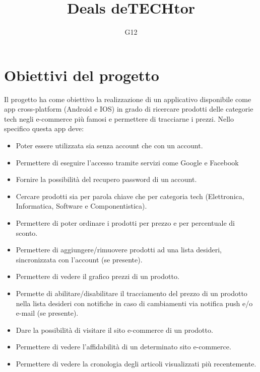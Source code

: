 \documentclass{article}
\author{G12}
\title{Deals deTECHtor}
\date{}
\begin{document}
\maketitle
\tableofcontents
\clearpage
\section{Obiettivi del progetto}
Il progetto ha come obiettivo la realizzazione di un applicativo disponibile come app cross-platform (Android e IOS) in grado di ricercare prodotti
delle categorie tech negli e-commerce più famosi e permettere di tracciarne i prezzi.
Nello specifico questa app deve:
    \begin{itemize}
        \item Poter essere utilizzata sia senza account che con un account.
        \item Permettere di eseguire l’accesso tramite servizi come Google e Facebook
        \item Fornire la possibilità del recupero password di un account.
        \item Cercare prodotti sia per parola chiave che per categoria tech (Elettronica, Informatica, Software e Componentistica).
        \item Permettere di poter ordinare i prodotti per prezzo e per percentuale di sconto.
        \item Permettere di aggiungere/rimuovere prodotti ad una lista desideri, sincronizzata con l'account (se presente).
        \item Permettere di vedere il grafico prezzi di un prodotto.
        \item Permette di abilitare/disabilitare il tracciamento del prezzo di un prodotto nella lista desideri con notifiche
                in caso di cambiamenti via notifica push e/o e-mail (se presente).
        \item Dare la possibilità di visitare il sito e-commerce di un prodotto.
        \item Permettere di vedere l'affidabilità di un determinato sito e-commerce.
        \item Permettere di vedere la cronologia degli articoli visualizzati più recentemente.
    \end{itemize}
\end{document}
